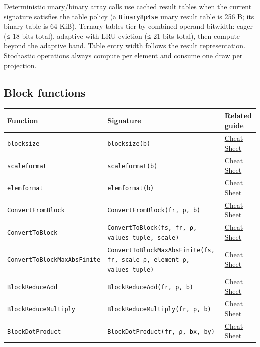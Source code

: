 Deterministic unary/binary array calls use cached result tables when the current signature satisfies the table policy (a \texttt{Binary8p4se} unary result table is 256 B; its binary table is 64 KiB). Ternary tables tier by combined operand bitwidth: eager (≤ 18 bits total), adaptive with LRU eviction (≤ 21 bits total), then compute beyond the adaptive band. Table entry width follows the result representation. Stochastic operations always compute per element and consume one draw per projection.



\subsection{Block functions}



\label{5661144322417720737}{}



\begin{table}[h]
\centering
\begin{tabulary}{\linewidth}{L L L}
\toprule
Function & Signature & Related guide \\
\toprule
\texttt{blocksize} & \texttt{blocksize(b)} & \href{help\_\allowbreak{}cheat\_\allowbreak{}sheet.md}{Cheat Sheet} \\
\texttt{scaleformat} & \texttt{scaleformat(b)} & \href{help\_\allowbreak{}cheat\_\allowbreak{}sheet.md}{Cheat Sheet} \\
\texttt{elemformat} & \texttt{elemformat(b)} & \href{help\_\allowbreak{}cheat\_\allowbreak{}sheet.md}{Cheat Sheet} \\
\texttt{ConvertFromBlock} & \texttt{ConvertFromBlock(\allowbreak{}fr, ρ, b)} & \href{help\_\allowbreak{}cheat\_\allowbreak{}sheet.md}{Cheat Sheet} \\
\texttt{ConvertToBlock} & \texttt{ConvertToBlock(\allowbreak{}fs, fr, ρ, values\_\allowbreak{}tuple, scale)} & \href{help\_\allowbreak{}cheat\_\allowbreak{}sheet.md}{Cheat Sheet} \\
\texttt{ConvertToBlockMaxAbsFinite} & \texttt{ConvertToBlockMaxAbsFinite(\allowbreak{}fs, fr, scale\_\allowbreak{}ρ, element\_\allowbreak{}ρ, values\_\allowbreak{}tuple)} & \href{help\_\allowbreak{}cheat\_\allowbreak{}sheet.md}{Cheat Sheet} \\
\texttt{BlockReduceAdd} & \texttt{BlockReduceAdd(fr, ρ, b)} & \href{help\_\allowbreak{}cheat\_\allowbreak{}sheet.md}{Cheat Sheet} \\
\texttt{BlockReduceMultiply} & \texttt{BlockReduceMultiply(\allowbreak{}fr, ρ, b)} & \href{help\_\allowbreak{}cheat\_\allowbreak{}sheet.md}{Cheat Sheet} \\
\texttt{BlockDotProduct} & \texttt{BlockDotProduct(\allowbreak{}fr, ρ, bx, by)} & \href{help\_\allowbreak{}cheat\_\allowbreak{}sheet.md}{Cheat Sheet} \\
\bottomrule
\end{tabulary}

\end{table}



